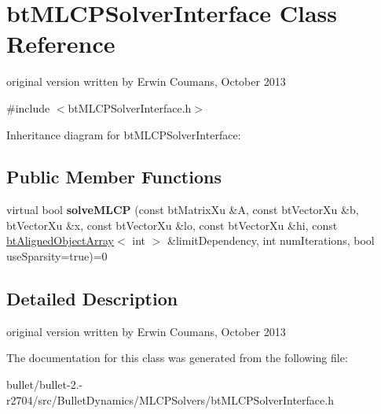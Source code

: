 \hypertarget{classbt_m_l_c_p_solver_interface}{\section{bt\+M\+L\+C\+P\+Solver\+Interface Class Reference}
\label{classbt_m_l_c_p_solver_interface}
}


original version written by Erwin Coumans, October 2013  




{\ttfamily \#include $<$bt\+M\+L\+C\+P\+Solver\+Interface.\+h$>$}



Inheritance diagram for bt\+M\+L\+C\+P\+Solver\+Interface\+:
\subsection*{Public Member Functions}
\begin{DoxyCompactItemize}
\item 
\hypertarget{classbt_m_l_c_p_solver_interface_a9529ab6fb462ddc58582a8647af67e2c}{virtual bool {\bfseries solve\+M\+L\+C\+P} (const bt\+Matrix\+Xu \&A, const bt\+Vector\+Xu \&b, bt\+Vector\+Xu \&x, const bt\+Vector\+Xu \&lo, const bt\+Vector\+Xu \&hi, const \hyperlink{classbt_aligned_object_array}{bt\+Aligned\+Object\+Array}$<$ int $>$ \&limit\+Dependency, int num\+Iterations, bool use\+Sparsity=true)=0}\label{classbt_m_l_c_p_solver_interface_a9529ab6fb462ddc58582a8647af67e2c}

\end{DoxyCompactItemize}


\subsection{Detailed Description}
original version written by Erwin Coumans, October 2013 

The documentation for this class was generated from the following file\+:\begin{DoxyCompactItemize}
\item 
bullet/bullet-\/2.-\/r2704/src/\+Bullet\+Dynamics/\+M\+L\+C\+P\+Solvers/bt\+M\+L\+C\+P\+Solver\+Interface.\+h\end{DoxyCompactItemize}
